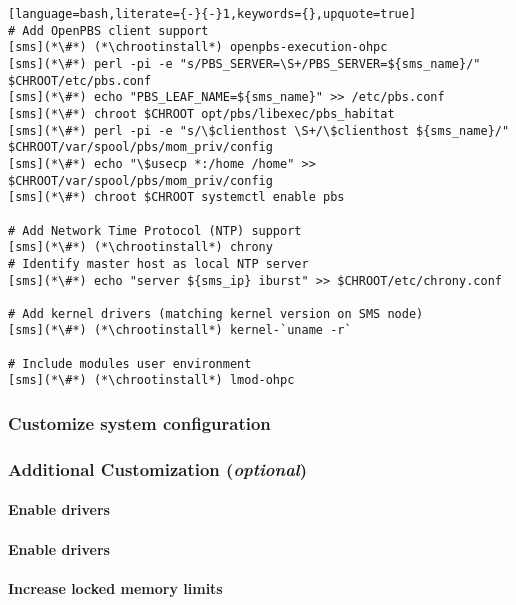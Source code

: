 \documentclass[letterpaper]{article}
\newcommand{\chrootinstall}{yum -y --installroot=\$CHROOT install}
\begin{document}
\begin{lstlisting}[language=bash,literate={-}{-}1,keywords={},upquote=true]
# Add OpenPBS client support
[sms](*\#*) (*\chrootinstall*) openpbs-execution-ohpc
[sms](*\#*) perl -pi -e "s/PBS_SERVER=\S+/PBS_SERVER=${sms_name}/" $CHROOT/etc/pbs.conf
[sms](*\#*) echo "PBS_LEAF_NAME=${sms_name}" >> /etc/pbs.conf
[sms](*\#*) chroot $CHROOT opt/pbs/libexec/pbs_habitat
[sms](*\#*) perl -pi -e "s/\$clienthost \S+/\$clienthost ${sms_name}/" $CHROOT/var/spool/pbs/mom_priv/config
[sms](*\#*) echo "\$usecp *:/home /home" >> $CHROOT/var/spool/pbs/mom_priv/config
[sms](*\#*) chroot $CHROOT systemctl enable pbs

# Add Network Time Protocol (NTP) support
[sms](*\#*) (*\chrootinstall*) chrony
# Identify master host as local NTP server
[sms](*\#*) echo "server ${sms_ip} iburst" >> $CHROOT/etc/chrony.conf

# Add kernel drivers (matching kernel version on SMS node)
[sms](*\#*) (*\chrootinstall*) kernel-`uname -r`

# Include modules user environment
[sms](*\#*) (*\chrootinstall*) lmod-ohpc
\end{lstlisting}

\subsubsection{Customize system configuration} \label{sec:master_customization}


\subsubsection{Additional Customization ({\em optional})} \label{sec:addl_customizations}


\paragraph{Enable \InfiniBand{} drivers}


\paragraph{Enable \OmniPath{} drivers}



\paragraph{Increase locked memory limits}

\end{document}
